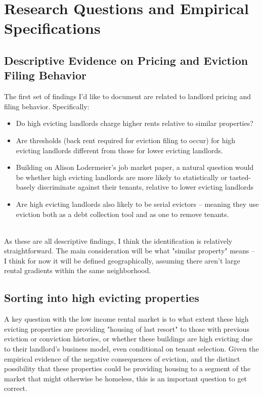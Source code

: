 \documentclass{article}
\begin{document}
\section{Research Questions and Empirical Specifications}

\subsection{Descriptive Evidence on Pricing and Eviction Filing Behavior}

The first set of findings I'd like to document are related to landlord pricing and filing behavior. Specifically:

\begin{itemize}
    \item Do high evicting landlords charge higher rents relative to similar properties?
    \item Are thresholds (back rent required for eviction filing to occur) for high evicting landlords different from those for lower evicting landlords. 
    \item Building on Alison Lodermeier's job market paper, a natural question would be whether high evicting landlords are more likely to statistically or tasted-basely discriminate against their tenants, relative to lower evicting landlords 
    \item Are high evicting landlords also likely to be serial evictors -- meaning they use eviction both as a debt collection tool and as one to remove tenants.
\end{itemize} \\

As these are all descriptive findings, I think the identification is relatively straightforward. The main consideration will be what "similar property" means -- I think for now it will be defined geographically, assuming there aren't large rental gradients within the same neighborhood.


\subsection{Sorting into high evicting properties}
A key question with the low income rental market is to what extent these high evicting properties are providing "housing of last resort" to those with previous eviction or conviction histories, or whether these buildings are high evicting due to their landlord's business model, even conditional on tenant selection. Given the empirical evidence of the negative consequences of eviction, and the distinct possibility that these properties could be providing housing to a segment of the market that might otherwise be homeless, this is an important question to get correct. \\
\end{document}
